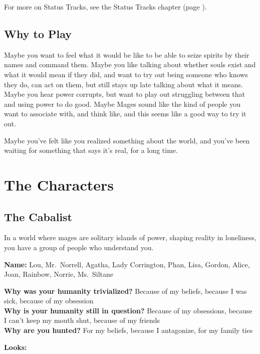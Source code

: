 \documentclass[
]{article}
\begin{document}
For more on Status Tracks, see the Status Tracks chapter (page \pageref{Status Tracks chapter}).

\hypertarget{why-to-play}{%
\subsection{Why to Play}\label{why-to-play}}

Maybe you want to feel what it would be like to be able to seize spirits
by their names and command them. Maybe you like talking about whether
souls exist and what it would mean if they did, and want to try out
being someone who knows they do, can act on them, but still stays up
late talking about what it means. Maybe you hear power corrupts, but
want to play out struggling between that and using power to do good.
Maybe Mages sound like the kind of people you want to associate with,
and think like, and this seems like a good way to try it out.

Maybe you've felt like you realized something about the world, and
you've been waiting for something that says it's real, for a long time.

\newpage

\hypertarget{the-characters}{%
\section{The Characters}\label{the-characters}}

\hypertarget{the-cabalist}{%
\subsection{The Cabalist}\label{the-cabalist}}

In a world where mages are solitary islands of power, shaping reality in
loneliness, you have a group of people who understand you.

\textbf{Name:} Lou, Mr.~Norrell, Agatha, Lady Corrington, Phan, Lisa,
Gordon, Alice, Joan, Rainbow, Norrie, Ms.~Siltane

\textbf{Why was your humanity trivialized?} Because of my beliefs,
because I was sick, because of my obsession\\
\textbf{Why is your humanity still in question?} Because of my
obsessions, because I can't keep my mouth shut, because of my friends\\
\textbf{Why are you hunted?} For my beliefs, because I antagonize, for
my family ties

\textbf{Looks:}
\end{document}
